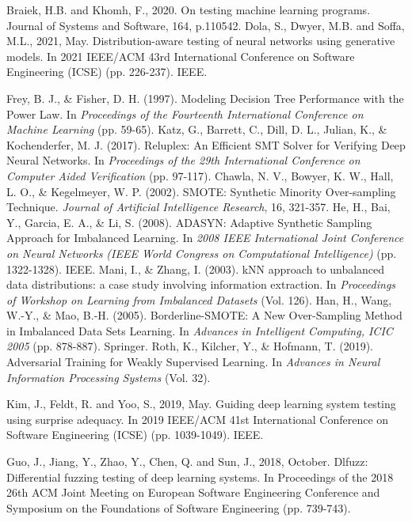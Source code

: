 \begin{singlespace}
\begin{thebibliography}{}
Braiek, H.B. and Khomh, F., 2020. On testing machine learning programs. Journal of Systems and Software, 164, p.110542.
Dola, S., Dwyer, M.B. and Soffa, M.L., 2021, May. Distribution-aware testing of neural networks using generative models. In 2021 IEEE/ACM 43rd International Conference on Software Engineering (ICSE) (pp. 226-237). IEEE.

     Frey, B. J., \& Fisher, D. H. (1997). Modeling Decision Tree Performance with the Power Law. In \textit{Proceedings of the Fourteenth International Conference on Machine Learning} (pp. 59-65).
     Katz, G., Barrett, C., Dill, D. L., Julian, K., \& Kochenderfer, M. J. (2017). Reluplex: An Efficient SMT Solver for Verifying Deep Neural Networks. In \textit{Proceedings of the 29th International Conference on Computer Aided Verification} (pp. 97-117).
     Chawla, N. V., Bowyer, K. W., Hall, L. O., \& Kegelmeyer, W. P. (2002). SMOTE: Synthetic Minority Over-sampling Technique. \textit{Journal of Artificial Intelligence Research}, 16, 321-357.
     He, H., Bai, Y., Garcia, E. A., \& Li, S. (2008). ADASYN: Adaptive Synthetic Sampling Approach for Imbalanced Learning. In \textit{2008 IEEE International Joint Conference on Neural Networks (IEEE World Congress on Computational Intelligence)} (pp. 1322-1328). IEEE.
     Mani, I., \& Zhang, I. (2003). kNN approach to unbalanced data distributions: a case study involving information extraction. In \textit{Proceedings of Workshop on Learning from Imbalanced Datasets} (Vol. 126).
     Han, H., Wang, W.-Y., \& Mao, B.-H. (2005). Borderline-SMOTE: A New Over-Sampling Method in Imbalanced Data Sets Learning. In \textit{Advances in Intelligent Computing, ICIC 2005} (pp. 878-887). Springer.
     Roth, K., Kilcher, Y., \& Hofmann, T. (2019). Adversarial Training for Weakly Supervised Learning. In \textit{Advances in Neural Information Processing Systems} (Vol. 32).


   
  
  


    Kim, J., Feldt, R. and Yoo, S., 2019, May. Guiding deep learning system testing using surprise adequacy. In 2019 IEEE/ACM 41st International Conference on Software Engineering (ICSE) (pp. 1039-1049). IEEE.
  
   
    Guo, J., Jiang, Y., Zhao, Y., Chen, Q. and Sun, J., 2018, October. Dlfuzz: Differential fuzzing testing of deep learning systems. In Proceedings of the 2018 26th ACM Joint Meeting on European Software Engineering Conference and Symposium on the Foundations of Software Engineering (pp. 739-743).






\end{thebibliography}
\end{singlespace}

